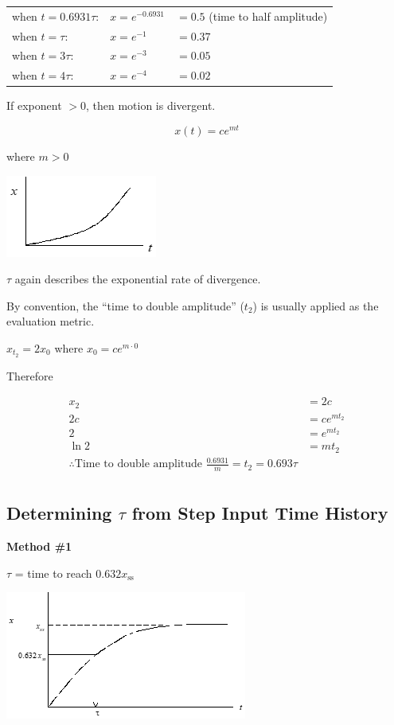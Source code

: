 \documentclass[
]{book}
\begin{document}
\begin{longtable}[]{@{}lll@{}}
\toprule
\endhead
when \(t = 0.6931\tau\): & \(x = e^{−0.6931}\) & \(= 0.5\) (time to half amplitude)\tabularnewline
when \(t = \tau\): & \(x = e^{−1}\) & \(= 0.37\)\tabularnewline
when \(t = 3\tau\):~~~~ & \(x = e^{−3}\) & \(= 0.05\)\tabularnewline
when \(t = 4\tau\): & \(x = e^{−4}\) & \(= 0.02\)\tabularnewline
\bottomrule
\end{longtable}

If exponent \(\gt 0\), then motion is divergent.

\[x(t) = ce^{mt}\]

where \(m \gt 0\)

\includegraphics{media/08/image15.png}

\(\tau\) again describes the exponential rate of divergence.

By convention, the ``time to double amplitude'' (\(t_2\)) is usually applied as the evaluation metric.

\(x_{t_2} = 2x_0\) where \(x_0 = ce^{m\cdot 0}\)

Therefore

\[
\begin{align}
x_2 &= 2c \\
2c &= ce^{mt_2} \\
2 &= e^{mt_2} \\
\ln 2 &= mt_2 \\
\therefore \text{Time to double amplitude } \frac{0.6931}{m} = t_2 = 0.693\tau \\
\end{align}
\]

\hypertarget{determining-tau-from-step-input-time-history}{%
\subsection{\texorpdfstring{Determining \(\tau\) from Step Input Time History}{Determining \textbackslash tau from Step Input Time History}}\label{determining-tau-from-step-input-time-history}}

\textbf{Method \#1}

\(\tau\) = time to reach \(0.632 x_{\mathrm{ss}}\)

\includegraphics{media/08/image18.png}
\end{document}
